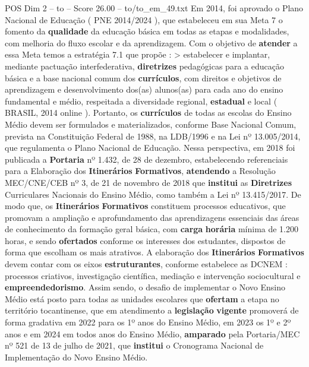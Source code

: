 \begin{textsample}{POS Dim 2 – to – Score 26.00 – to/to\_em\_49.txt}
Em 2014, foi aprovado o Plano Nacional de Educação ( PNE 2014/2024 ), que estabeleceu em sua Meta 7 o fomento da \textbf{qualidade} da educação básica em todas as etapas e modalidades, com melhoria do fluxo escolar e da aprendizagem.
Com o objetivo de \textbf{atender} a essa Meta temos a estratégia 7.1 que propõe : > estabelecer e implantar, mediante pactuação interfederativa, \textbf{diretrizes} pedagógicas para a educação básica e a base nacional comum dos \textbf{currículos}, com direitos e objetivos de aprendizagem e desenvolvimento dos(as) alunos(as) para cada ano do ensino fundamental e médio, respeitada a diversidade regional, \textbf{estadual} e local ( BRASIL, 2014 online ).
Portanto, os \textbf{currículos} de todas as escolas do Ensino Médio devem ser formulados e materializados, conforme Base Nacional Comum, prevista na Constituição Federal de 1988, na LDB/1996 e na Lei nº 13.005/2014, que regulamenta o Plano Nacional de Educação.
Nessa perspectiva, em 2018 foi publicada a \textbf{Portaria} nº 1.432, de 28 de dezembro, estabelecendo referenciais para a Elaboração dos \textbf{Itinerários} \textbf{Formativos}, \textbf{atendendo} a Resolução MEC/CNE/CEB nº 3, de 21 de novembro de 2018 que \textbf{institui} as \textbf{Diretrizes} Curriculares Nacionais do Ensino Médio, como também a Lei nº 13.415/2017.
De modo que, os \textbf{Itinerários} \textbf{Formativos} constituem processos educativos, que promovam a ampliação e aprofundamento das aprendizagens essenciais das áreas de conhecimento da formação geral básica, com \textbf{carga} \textbf{horária} mínima de 1.200 horas, e sendo \textbf{ofertados} conforme os interesses dos estudantes, dispostos de forma que escolham os mais atrativos.
A elaboração dos \textbf{Itinerários} \textbf{Formativos} devem contar com os eixos \textbf{estruturantes}, conforme estabelece as DCNEM : processos criativos, investigação científica, mediação e intervenção sociocultural e \textbf{empreendedorismo}.
Assim sendo, o desafio de implementar o Novo Ensino Médio está posto para todas as unidades escolares que \textbf{ofertam} a etapa no território tocantinense, que em atendimento a \textbf{legislação} \textbf{vigente} promoverá de forma gradativa em 2022 para os 1º anos do Ensino Médio, em 2023 os 1º e 2º anos e em 2024 em todos anos do Ensino Médio, \textbf{amparado} pela Portaria/MEC nº 521 de 13 de julho de 2021, que \textbf{institui} o Cronograma Nacional de Implementação do Novo Ensino Médio.

\end{textsample}

